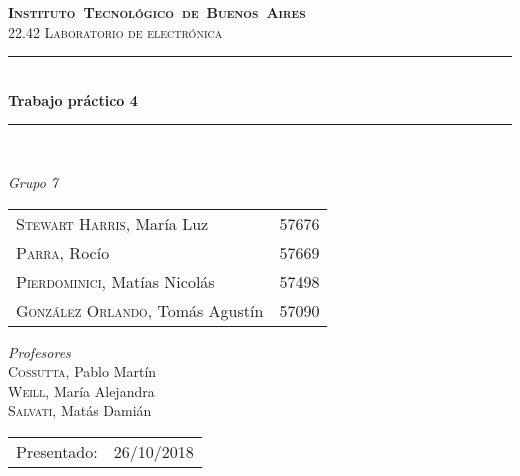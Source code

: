 \begin{titlepage}
\newcommand{\HRule}{\rule{\linewidth}{0.5mm}}
\center
\mbox{\textsc{\LARGE \bfseries {Instituto Tecnol\'ogico de Buenos Aires}}}\\[1.5cm]
\textsc{\Large 22.42 Laboratorio de electr\'onica}\\[0.5cm]


\HRule \\[0.6cm]
{ \Huge \bfseries Trabajo pr\'actico 4}\\[0.4cm] %
\HRule \\[1.5cm]


{\large

\emph{Grupo 7}\\
\vspace{3px}

\begin{tabular}{lr} 	
\textsc{Stewart Harris}, Mar\'ia Luz  & 57676 \\ 	
\textsc{Parra}, Roc\'io  & 57669 \\ 	
\textsc{Pierdominici}, Mat\'ias Nicol\'as & 57498 \\     
\textsc{Gonz\'alez Orlando}, Tom\'as Agust\'in  & 57090 
\end{tabular}

\vspace{20px}

\emph{Profesores}\\
\vspace{3px}
\textsc{Cossutta,} Pablo Mart\'in \\ 	
\textsc{Weill,} Mar\'ia Alejandra \\
\textsc{Salvati,} Mat\'as Dami\'an \\

\vspace{100px}

\begin{tabular}{ll}

Presentado: & 26/10/2018\\

\end{tabular}

}

\vfill

\end{titlepage}
